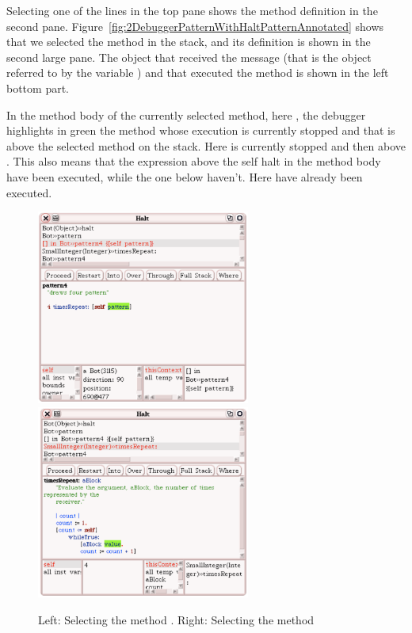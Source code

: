 Selecting one of the lines in the top pane shows the method definition in the second pane.  Figure~\ref{fig:2DebuggerPatternWithHaltPatternAnnotated} shows that we selected the method  in the stack, and its definition is shown in the second large pane. The object that received the message (that is the object referred to by the variable ) and that executed the method  is shown in the left bottom part. 

In the method body of the currently selected method, here ,  the debugger highlights in green the method whose execution is currently stopped and that is above the selected method on the stack. Here  is currently stopped and then above . This also means that the expression above the self halt in the method body have been executed, while the one below haven't. Here  have already been executed. 

\begin{figure}[h]
\centerline{\includegraphics[width=7cm]{3DebuggerPattern}\hfill\includegraphics[width=7cm]{4DebuggerPatternTimesRepeat}}
\caption{Left: Selecting the method . Right: Selecting the method  \label{fig:3DebuggerPattern}}
\end{figure}


